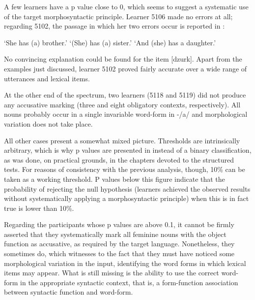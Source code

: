 A few learners have a p value close to 0, which seems to suggest a systematic use of the target morphosyntactic principle. Learner 5106 made no errors at all; regarding 5102, the passage in which her two errors occur is reported in :

\ea%
    \label{ex:07:8}
    \ea{\label{ex:07:8a}
    \gll    [ˈɔna   ɔn   ma  ˈbrat-a].\\
            \hspaceThis{[}she  he  has  brother-\textsc{acc}\\}
    \glt    ‘She has (a) brother.’
    \ex{\label{ex:07:8b}
    \gll    [ma   ˈʃostr-a].\\
            \hspaceThis{[}has  sister-\textsc{nom}\\}
    \glt    ‘(She) has (a) sister.’
    \ex{\label{ex:07:8c}
    \gll    [i  ma  dzurk].\\
            \hspaceThis{[}and  has  daughter.?\\}
    \glt    ‘And (she) has a daughter.’
    \z
\z

No convincing explanation could be found for the item [dzurk]. Apart from the examples just discussed, learner 5102 proved fairly accurate over a wide range of utterances and lexical items. 

At the other end of the spectrum, two learners (5118 and 5119) did not produce any accusative marking (three and eight obligatory contexts, respectively). All nouns probably occur in a single invariable word-form in -/a/ and morphological variation does not take place.

All other cases present a somewhat mixed picture. Thresholds are intrinsically arbitrary, which is why p values are presented in  instead of a binary classification, as was done, on practical grounds, in the chapters devoted to the structured tests. For reasons of consistency with the previous analysis, though, 10\% can be taken as a working threshold. P values below this figure indicate that the probability of rejecting the null hypothesis (learners achieved the observed results without systematically applying a morphosyntactic principle) when this is in fact true is lower than 10\%.

Regarding the participants whose p values are above 0.1, it cannot be firmly asserted that they systematically mark all feminine nouns with the object function as accusative, as required by the target language. Nonetheless, they sometimes do, which witnesses to the fact that they must have noticed some morphological variation in the input, identifying the word forms in which lexical items may appear. What is still missing is the ability to use the correct word-form in the appropriate syntactic context, that is, a form-function association between syntactic function and word-form.

